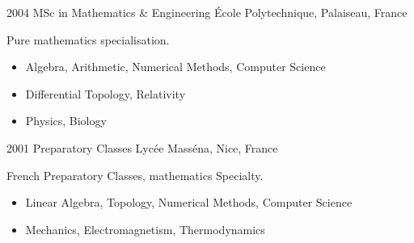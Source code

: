\begin{entrylist}
  \entry
    {2004}
    {MSc in Mathematics \& Engineering}
    {\'{E}cole Polytechnique, Palaiseau, France}
    {Pure mathematics specialisation.
    \begin{itemize}
        \item Algebra, Arithmetic, Numerical Methods, Computer Science
        \item Differential Topology, Relativity
        \item Physics, Biology
    \end{itemize}
    }

  \entry
    {2001}
    {Preparatory Classes}
    {Lyc\'{e}e Mass\'{e}na, Nice, France}
    {French Preparatory Classes, mathematics Specialty.
    \begin{itemize}
        \item Linear Algebra, Topology, Numerical Methods, Computer Science
        \item Mechanics, Electromagnetism, Thermodynamics
    \end{itemize}
    }
\end{entrylist}




